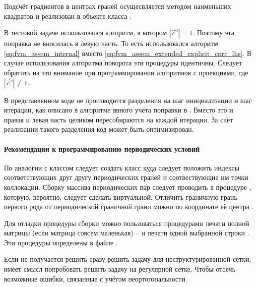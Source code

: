 Подсчёт градиентов в центрах граней осущесвляется методом наименьших
квадратов  и реализован в объекте  класса .

В тестовой задаче использовался алгоритм, в котором $|\vec c'| = 1$.
Поэтому эта поправка не вносилась в левую часть. То есть использовался алгоритм
\cref{eq:fvm_assem_internal} вместо \cref{eq:fvm_assem_extended_explicit_corr_lhs}.
В случае использования алгоритма поворота эти процедуры идентичны.
Следует обратить на это внимание при программировании алгоритмов с проекциями, где $|\vec c'| \neq 1$.

В представленном коде не производится разделения на шаг инициализации и шаг итерации, как описано в алгоритме
явного учёта поправки в .
Вместо это и правая и левая часть целиком пересобираются на каждой итерации.
За счёт реализации такого разделения код может быть оптимизирован.

\paragraph{Рекомендации к программированию периодических условий}
По аналогии с классом  следует
создать класс  куда следует
положить индексы соответствующих друг другу периодических граней
и соотвествующие им точки коллокации.
Сборку массива периодических пар следует проводить в процедуре
, которую, вероятно, следует сделать виртуальной.
Отличить граничную грань первого рода от периодической граничной грани
можно по координате её центра .

Для отладки процедуры сборки можно
пользоваться процедурами печати полной матрицы (если матрица совсем маленькая)
--  и 
печати  одной выбранной строки .
Эти процедуры определены в файле .

Если не получается решить сразу решить задачу для неструктурированной сетки,
имеет смысл попробовать решить задачу на регулярной сетке. Чтобы отсечь возможные 
ошибки, связанные с учётом неортогональности.

